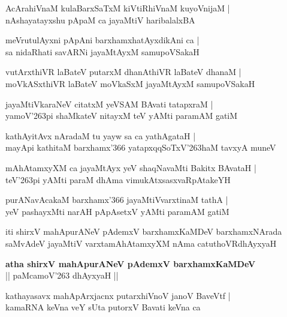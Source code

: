 \begin{shloka}
AcArahiVnaM kulaBarxSaTxM kiVtiRhiVnaM kuyoVnijaM |\\
nAshayatayxshu pApaM ca jayaMtiV haribalalxBA
\end{shloka}

\begin{shloka}
meVrutulAyxni pApAni barxhamxhatAyxdikAni ca |\\
sa nidaRhati savARNi jayaMtAyxM samupoVSakaH
\end{shloka}

\begin{shloka}
vutArxthiVR laBateV putarxM dhanAthiVR laBateV dhanaM |\\
moVkASxthiVR laBateV moVkaSxM jayaMtAyxM samupoVSakaH 
\end{shloka}

\begin{shloka}
jayaMtiVkaraNeV citatxM yeVSAM BAvati tatapxraM |\\
yamoV\char'263pi shaMkateV nitayxM teV yAMti paramAM gatiM
\end{shloka}

\begin{shloka}
kathAyitAvx nAradaM tu yayw sa ca yathAgataH |\\
mayApi kathitaM barxhamx\char'366 yatapxqqSoTxV\char'263haM tavxyA muneV 
\end{shloka}

\begin{shloka}
mAhAtamxyXM ca jayaMtAyx yeV shaqNavaMti Bakitx BAvataH |\\
teV\char'263pi yAMti paraM dhAma vimukAtxsasxvaRpAtakeYH 
\end{shloka}

\begin{shloka}
purANavAcakaM barxhamx\char'366 jayaMtiVvarxtinaM tathA |\\
yeV pashayxMti narAH pApAsetxV yAMti paramAM gatiM
\end{shloka}
iti shirxV mahApurANeV pAdemxV barxhamxKaMDeV barxhamxNArada saMvAdeV jayaMtiV varxtamAhAtamxyXM nAma catuthoVRdhAyxyaH

\begin{center}
\textbf{\large atha shirxV mahApurANeV pAdemxV barxhamxKaMDeV}\\
|| paMcamoV\char'263 dhAyxyaH ||
\end{center}

\setcounter{shloka}{0}
\begin{shloka}
kathayasavx mahApArxjacnx putarxhiVnoV janoV BaveVtf |\\
kamaRNA keVna veY sUta putorxV Bavati keVna ca
\end{shloka}

